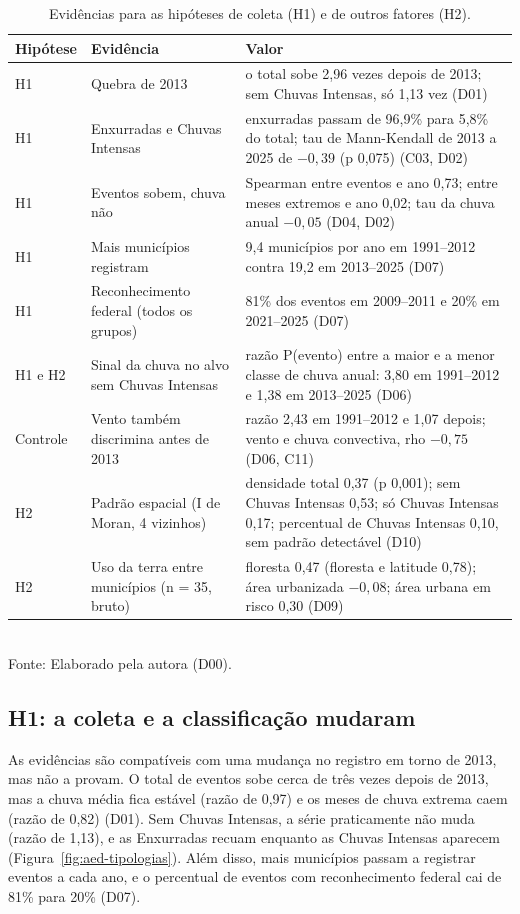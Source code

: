 \begin{table}[!htb]
\centering
\caption{Evidências para as hipóteses de coleta (H1) e de outros fatores (H2).}
\label{tab:aed-evidencias}
{\small
\renewcommand{\arraystretch}{1.2}
\begin{tabular}{@{}p{1.6cm}p{4.2cm}p{7.2cm}@{}}
\toprule
\textbf{Hipótese} & \textbf{Evidência} & \textbf{Valor}\\
\midrule
H1 & Quebra de 2013 & o total sobe 2,96 vezes depois de 2013; sem Chuvas Intensas, só 1,13 vez (D01)\\
H1 & Enxurradas e Chuvas Intensas & enxurradas passam de 96,9\% para 5,8\% do total; tau de Mann-Kendall de 2013 a 2025 de $-0{,}39$ (p 0,075) (C03, D02)\\
H1 & Eventos sobem, chuva não & Spearman entre eventos e ano 0,73; entre meses extremos e ano 0,02; tau da chuva anual $-0{,}05$ (D04, D02)\\
H1 & Mais municípios registram & 9,4 municípios por ano em 1991--2012 contra 19,2 em 2013--2025 (D07)\\
H1 & Reconhecimento federal (todos os grupos) & 81\% dos eventos em 2009--2011 e 20\% em 2021--2025 (D07)\\
H1 e H2 & Sinal da chuva no alvo sem Chuvas Intensas & razão P(evento) entre a maior e a menor classe de chuva anual: 3,80 em 1991--2012 e 1,38 em 2013--2025 (D06)\\
Controle & Vento também discrimina antes de 2013 & razão 2,43 em 1991--2012 e 1,07 depois; vento e chuva convectiva, rho $-0{,}75$ (D06, C11)\\
H2 & Padrão espacial (I de Moran, 4 vizinhos) & densidade total 0,37 (p 0,001); sem Chuvas Intensas 0,53; só Chuvas Intensas 0,17; percentual de Chuvas Intensas 0,10, sem padrão detectável (D10)\\
H2 & Uso da terra entre municípios (n = 35, bruto) & floresta 0,47 (floresta e latitude 0,78); área urbanizada $-0{,}08$; área urbana em risco 0,30 (D09)\\
\bottomrule
\end{tabular}}\\[2mm]
{\small Fonte: Elaborado pela autora (D00).}
\end{table}

\subsection{H1: a coleta e a classificação mudaram}

As evidências são compatíveis com uma mudança no registro em torno de 2013, mas não a provam. O total de eventos sobe cerca de três vezes depois de 2013, mas a chuva média fica estável (razão de 0,97) e os meses de chuva extrema caem (razão de 0,82) (D01). Sem Chuvas Intensas, a série praticamente não muda (razão de 1,13), e as Enxurradas recuam enquanto as Chuvas Intensas aparecem (Figura~\ref{fig:aed-tipologias}). Além disso, mais municípios passam a registrar eventos a cada ano, e o percentual de eventos com reconhecimento federal cai de 81\% para 20\% (D07).

